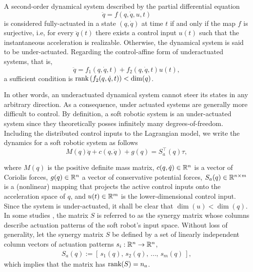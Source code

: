 \begin{definition}
A second-order dynamical system described by the partial differential equation
\begin{equation}
\ddot{q} = f(q,\dot{q},u,t)
\end{equation}
is considered fully-actuated in a state $(q,\dot{q})$ at time $t$ if and only if the map $f$ is surjective, i.e, for every $\ddot{q}(t)$ there exists a control input $u(t)$ such that the instantaneous acceleration is realizable. Otherwise, the dynamical system is said to be under-actuated. Regarding the control-affine form of underactuated systems, that is,
\begin{equation}
\ddot{q} = f_1(q,\dot{q},t) + f_2(q,\dot{q},t)u(t),
\end{equation}
a sufficient condition is $\textnormal{rank} \left(f_2(q,\dot{q},t)\right) < \dim(q)$.
\end{definition}

\noindent In other words, an underactuated dynamical system cannot steer its states in any arbitrary direction. As a consequence, under actuated systems are generally more difficult to control. By definition, a soft robotic system is an under-actuated system since they theoretically posses infinitely many degrees-of-freedom. Including the distributed control inputs to the Lagrangian model, we write the dynamics for a soft robotic system as follows
\begin{equation}
M(q)\ddot{q} + c(q,\dot{q}) + g(q)= S_a^\top(q) \tau,
\label{eq:under_actuated_ode}
\end{equation}

\noindent where $M(q)$ is the positive definite mass matrix, $c(q,\dot{q})\in \mathbb{R}^{n}$ is a vector of Coriolis forces, $g(q)\in \mathbb{R}^{n}$ a vector of conservative potential forces, $S_a(q) \in \mathbb{R}^{n\times m}$ is a (nonlinear) mapping that projects the active control inputs onto the acceleration space of ${q}$, and $u(t) \in \mathbb{R}^{m}$ is the lower-dimensional control input. Since the system is under-actuated, it shall be clear that $\dim(u) < \dim(q)$. In some studies \cite{Santina2019}, the matrix $S$ is referred to as the synergy matrix whose columns describe actuation patterns of the soft robot's input space. Without loss of generality, let the synergy matrix $S$ be defined by a set of linearly independent column vectors of actuation patterns $s_i: \mathbb{R}^n \to \mathbb{R}^n$,
\begin{align}
S_a(q) := \left[\,s_1(q),\,s_2(q),\,...,\,s_m(q)\,\right], 
\end{align}
which implies that the matrix has $\textnormal{rank}(S) = n_a$.

